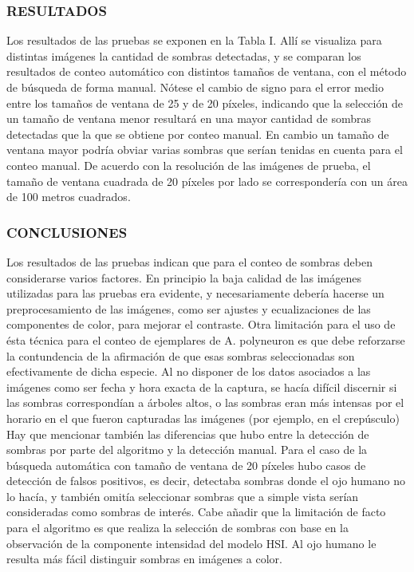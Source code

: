 \subsubsection{RESULTADOS}
Los resultados de las pruebas se exponen en la Tabla I. Allí se visualiza para distintas imágenes la cantidad de sombras detectadas, y se comparan los resultados de conteo automático con distintos tamaños de ventana, con el método de búsqueda de forma manual. Nótese el cambio de signo para el error medio entre los tamaños de ventana de 25 y de 20 píxeles, indicando que la selección de un tamaño de ventana menor resultará en una mayor 
cantidad de sombras detectadas que la que se obtiene por conteo manual. En cambio un tamaño de ventana mayor podría obviar varias sombras que serían tenidas en cuenta para el conteo manual. De acuerdo con la resolución de las imágenes de prueba, el tamaño de ventana cuadrada de 20 píxeles por lado se correspondería con un área de 100 metros cuadrados.

\subsubsection{CONCLUSIONES}
Los resultados de las pruebas indican que para el conteo de sombras deben considerarse varios factores. En principio la baja calidad de las imágenes utilizadas para las pruebas era evidente, y necesariamente debería hacerse un preprocesamiento de las imágenes, como ser ajustes y ecualizaciones de las componentes de color, para mejorar el contraste. Otra limitación para el uso de ésta técnica para el conteo de ejemplares de A. polyneuron es que debe reforzarse la contundencia de la afirmación de que esas sombras seleccionadas son efectivamente de dicha especie. Al no disponer de los datos asociados a las imágenes como ser fecha y hora exacta de la captura, se hacía difícil discernir si las sombras correspondían a árboles altos, o las sombras eran más intensas por el horario en el que fueron capturadas las imágenes (por ejemplo, en el crepúsculo) Hay que mencionar también las diferencias que hubo entre la detección de sombras por parte del algoritmo y la detección manual. Para el caso de la búsqueda automática con tamaño de ventana de 20 píxeles hubo casos de detección de falsos positivos, es decir, detectaba sombras donde el ojo humano no lo hacía, y también omitía seleccionar sombras que a simple vista serían consideradas como sombras de interés. Cabe añadir que la limitación de facto para el algoritmo es que realiza la selección de sombras con base en la observación de la componente intensidad del modelo HSI. Al ojo humano le resulta más fácil distinguir sombras en imágenes a color.

